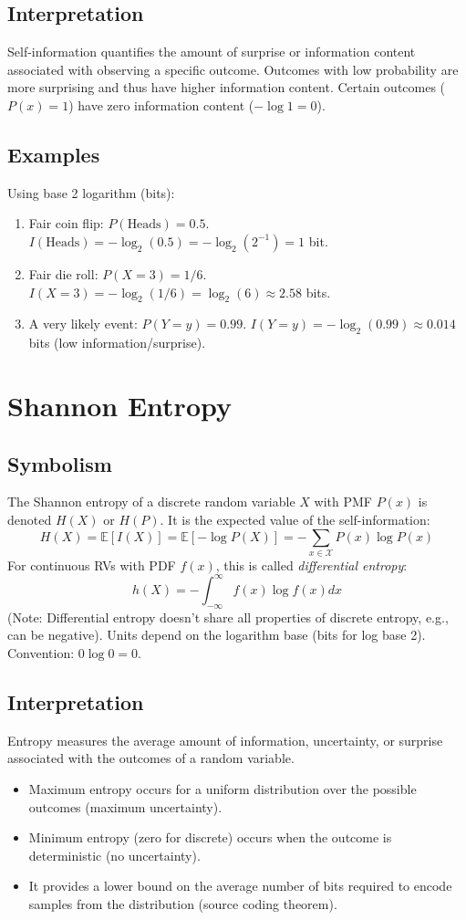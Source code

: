 \documentclass{article}
\newcommand{\E}{\mathbb{E}}    %
\begin{document}
\subsection*{Interpretation}
Self-information quantifies the amount of surprise or information content associated with observing a specific outcome. Outcomes with low probability are more surprising and thus have higher information content. Certain outcomes ($P(x)=1$) have zero information content ($-\log 1 = 0$).

\subsection*{Examples}
Using base 2 logarithm (bits):
\begin{enumerate}
    \item Fair coin flip: $P(\text{Heads}) = 0.5$. $I(\text{Heads}) = -\log_2(0.5) = -\log_2(2^{-1}) = 1$ bit.
    \item Fair die roll: $P(X=3) = 1/6$. $I(X=3) = -\log_2(1/6) = \log_2(6) \approx 2.58$ bits.
    \item A very likely event: $P(Y=y) = 0.99$. $I(Y=y) = -\log_2(0.99) \approx 0.014$ bits (low information/surprise).
\end{enumerate}

\section{Shannon Entropy}

\subsection*{Symbolism}
The Shannon entropy of a discrete random variable $X$ with PMF $P(x)$ is denoted $H(X)$ or $H(P)$. It is the expected value of the self-information:
\[ H(X) = \E[I(X)] = \E[-\log P(X)] = - \sum_{x \in \mathcal{X}} P(x) \log P(x) \]
For continuous RVs with PDF $f(x)$, this is called \emph{differential entropy}:
\[ h(X) = - \int_{-\infty}^{\infty} f(x) \log f(x) dx \]
(Note: Differential entropy doesn't share all properties of discrete entropy, e.g., can be negative). Units depend on the logarithm base (bits for log base 2). Convention: $0 \log 0 = 0$.

\subsection*{Interpretation}
Entropy measures the average amount of information, uncertainty, or surprise associated with the outcomes of a random variable.
\begin{itemize}
    \item Maximum entropy occurs for a uniform distribution over the possible outcomes (maximum uncertainty).
    \item Minimum entropy (zero for discrete) occurs when the outcome is deterministic (no uncertainty).
    \item It provides a lower bound on the average number of bits required to encode samples from the distribution (source coding theorem).
\end{itemize}
\end{document}
